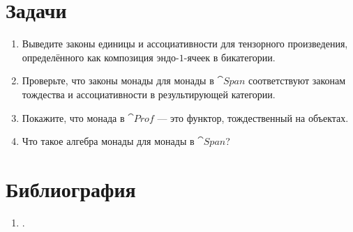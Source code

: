 \section{Задачи}

\begin{enumerate}
  \tightlist
  \item
        Выведите законы единицы и ассоциативности для тензорного произведения, определённого как
        композиция эндо-$1$-ячеек в бикатегории.
  \item
        Проверьте, что законы монады для монады в $\cat{Span}$ соответствуют
        законам тождества и ассоциативности в результирующей категории.
  \item
        Покажите, что монада в $\cat{Prof}$ — это функтор, тождественный на объектах.
  \item
        Что такое алгебра монады для монады в $\cat{Span}$?
\end{enumerate}

\section{Библиография}
\begin{enumerate}
  \tightlist
  \item
        .
\end{enumerate}
